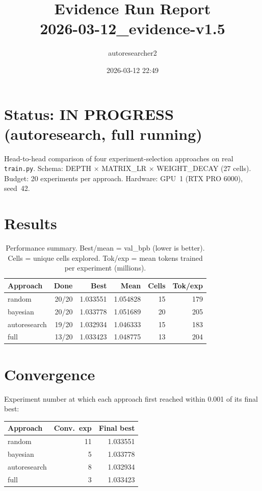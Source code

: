 \documentclass[10pt,a4paper,twocolumn]{article}
\title{\textbf{Evidence Run Report}\\[0.3em]
           \large 2026-03-12\_evidence-v1.5}
\author{autoresearcher2}
\date{2026-03-12 22:49}
\begin{document}
    \maketitle
    \thispagestyle{empty}

    \section*{Status: IN PROGRESS (autoresearch, full running)}

    Head-to-head comparison of four experiment-selection approaches on real \texttt{train.py}.
    Schema: DEPTH $\times$ MATRIX\_LR $\times$ WEIGHT\_DECAY (27 cells).
    Budget: 20 experiments per approach. Hardware: GPU~1 (RTX PRO 6000), seed~42.

    \section{Results}

    \begin{table}[h]
    \centering
    \small
    \begin{tabular}{lrrrrr}
    \toprule
    Approach & Done & Best & Mean & Cells & Tok/exp \\
    \midrule
        random & 20/20 & 1.033551 & 1.054828 & 15 & 179 \\
    bayesian & 20/20 & 1.033778 & 1.051689 & 20 & 205 \\
    autoresearch & 19/20 & 1.032934 & 1.046333 & 15 & 183 \\
    full & 13/20 & 1.033423 & 1.048775 & 13 & 204 \\
    \bottomrule
    \end{tabular}
    \caption{Performance summary. Best/mean = val\_bpb (lower is better). Cells = unique cells explored. Tok/exp = mean tokens trained per experiment (millions).}
    \end{table}

    \section{Convergence}

    Experiment number at which each approach first reached within 0.001 of its final best:

    \begin{table}[h]
    \centering
    \small
    \begin{tabular}{lrr}
    \toprule
    Approach & Conv.\ exp & Final best \\
    \midrule
        random & 11 & 1.033551 \\
    bayesian & 5 & 1.033778 \\
    autoresearch & 8 & 1.032934 \\
    full & 3 & 1.033423 \\
    \bottomrule
    \end{tabular}
    \end{table}
\end{document}
